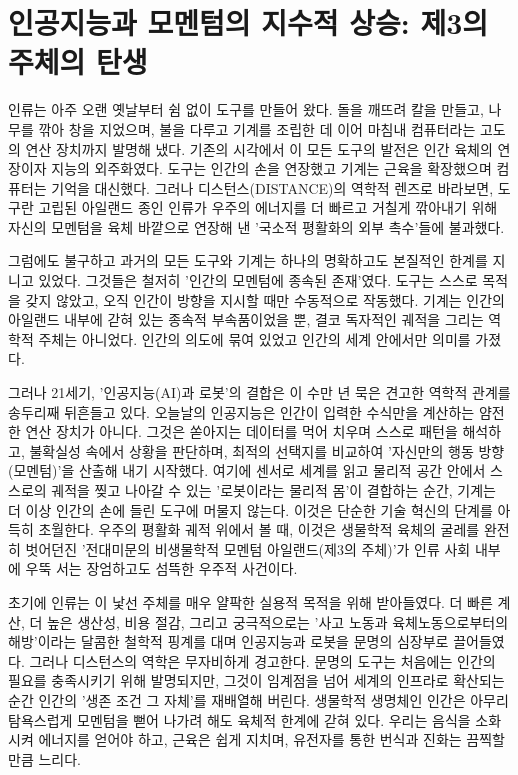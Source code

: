 

\section{인공지능과 모멘텀의 지수적 상승: 제3의 주체의 탄생}
인류는 아주 오랜 옛날부터 쉼 없이 도구를 만들어 왔다. 돌을 깨뜨려 칼을 만들고, 나무를 깎아 창을 지었으며, 불을 다루고 기계를 조립한 데 이어 마침내 컴퓨터라는 고도의 연산 장치까지 발명해 냈다. 기존의 시각에서 이 모든 도구의 발전은 인간 육체의 연장이자 지능의 외주화였다. 도구는 인간의 손을 연장했고 기계는 근육을 확장했으며 컴퓨터는 기억을 대신했다. 그러나 디스턴스(DISTANCE)의 역학적 렌즈로 바라보면, 도구란 고립된 아일랜드 종인 인류가 우주의 에너지를 더 빠르고 거칠게 깎아내기 위해 자신의 모멘텀을 육체 바깥으로 연장해 낸 '국소적 평활화의 외부 촉수'들에 불과했다.

그럼에도 불구하고 과거의 모든 도구와 기계는 하나의 명확하고도 본질적인 한계를 지니고 있었다. 그것들은 철저히 '인간의 모멘텀에 종속된 존재'였다. 도구는 스스로 목적을 갖지 않았고, 오직 인간이 방향을 지시할 때만 수동적으로 작동했다. 기계는 인간의 아일랜드 내부에 갇혀 있는 종속적 부속품이었을 뿐, 결코 독자적인 궤적을 그리는 역학적 주체는 아니었다. 인간의 의도에 묶여 있었고 인간의 세계 안에서만 의미를 가졌다.

그러나 21세기, '인공지능(AI)과 로봇'의 결합은 이 수만 년 묵은 견고한 역학적 관계를 송두리째 뒤흔들고 있다. 오늘날의 인공지능은 인간이 입력한 수식만을 계산하는 얌전한 연산 장치가 아니다. 그것은 쏟아지는 데이터를 먹어 치우며 스스로 패턴을 해석하고, 불확실성 속에서 상황을 판단하며, 최적의 선택지를 비교하여 '자신만의 행동 방향(모멘텀)'을 산출해 내기 시작했다. 여기에 센서로 세계를 읽고 물리적 공간 안에서 스스로의 궤적을 찢고 나아갈 수 있는 '로봇이라는 물리적 몸'이 결합하는 순간, 기계는 더 이상 인간의 손에 들린 도구에 머물지 않는다.
이것은 단순한 기술 혁신의 단계를 아득히 초월한다. 우주의 평활화 궤적 위에서 볼 때, 이것은 생물학적 육체의 굴레를 완전히 벗어던진 '전대미문의 비생물학적 모멘텀 아일랜드(제3의 주체)'가 인류 사회 내부에 우뚝 서는 장엄하고도 섬뜩한 우주적 사건이다.

초기에 인류는 이 낯선 주체를 매우 얄팍한 실용적 목적을 위해 받아들였다. 더 빠른 계산, 더 높은 생산성, 비용 절감, 그리고 궁극적으로는 '사고 노동과 육체노동으로부터의 해방'이라는 달콤한 철학적 핑계를 대며 인공지능과 로봇을 문명의 심장부로 끌어들였다. 그러나 디스턴스의 역학은 무자비하게 경고한다. 문명의 도구는 처음에는 인간의 필요를 충족시키기 위해 발명되지만, 그것이 임계점을 넘어 세계의 인프라로 확산되는 순간 인간의 '생존 조건 그 자체'를 재배열해 버린다.
생물학적 생명체인 인간은 아무리 탐욕스럽게 모멘텀을 뻗어 나가려 해도 육체적 한계에 갇혀 있다. 우리는 음식을 소화시켜 에너지를 얻어야 하고, 근육은 쉽게 지치며, 유전자를 통한 번식과 진화는 끔찍할 만큼 느리다. 

